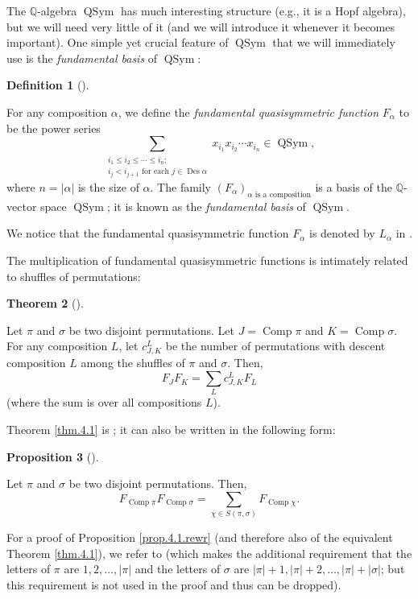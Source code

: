 \documentclass[numbers=enddot,12pt,final,onecolumn,notitlepage]{scrartcl}%
\theoremstyle{definition}
\newtheorem{theo}{Theorem}[section]
\newenvironment{theorem}[1][]
{\begin{theo}[#1]\begin{leftbar}}
{\end{leftbar}\end{theo}}
\newtheorem{prop}[theo]{Proposition}
\newenvironment{proposition}[1][]
{\begin{prop}[#1]\begin{leftbar}}
{\end{leftbar}\end{prop}}
\newtheorem{defi}[theo]{Definition}
\newenvironment{definition}[1][]
{\begin{defi}[#1]\begin{leftbar}}
{\end{leftbar}\end{defi}}
\let\sumnonlimits\sum
\renewcommand{\sum}{\sumnonlimits\limits}
\begin{document}
The $\mathbb{Q}$-algebra $\operatorname*{QSym}$ has much interesting structure
(e.g., it is a Hopf algebra), but we will need very little of it (and we will
introduce it whenever it becomes important). One simple yet crucial feature of
$\operatorname*{QSym}$ that we will immediately use is the \textit{fundamental
basis} of $\operatorname*{QSym}$:

\begin{definition}
For any composition $\alpha$, we define the \textit{fundamental quasisymmetric
function} $F_{\alpha}$ to be the power series%
\[
\sum_{\substack{i_{1}\leq i_{2}\leq\cdots\leq i_{n};\\i_{j}<i_{j+1}\text{ for
each }j\in\operatorname*{Des}\alpha}}x_{i_{1}}x_{i_{2}}\cdots x_{i_{n}}%
\in\operatorname*{QSym},
\]
where $n=\left\vert \alpha\right\vert $ is the size of $\alpha$. The family
$\left(  F_{\alpha}\right)  _{\alpha\text{ is a composition}}$ is a basis of
the $\mathbb{Q}$-vector space $\operatorname*{QSym}$; it is known as the
\textit{fundamental basis} of $\operatorname*{QSym}$.
\end{definition}

We notice that the fundamental quasisymmetric function $F_{\alpha}$ is denoted
by $L_{\alpha}$ in \cite[\S 5.2]{HopfComb}.

The multiplication of fundamental quasisymmetric functions is intimately
related to shuffles of permutations:

\begin{theorem}
\label{thm.4.1}Let $\pi$ and $\sigma$ be two disjoint permutations. Let
$J=\operatorname*{Comp}\pi$ and $K=\operatorname*{Comp}\sigma$. For any
composition $L$, let $c_{J,K}^{L}$ be the number of permutations with descent
composition $L$ among the shuffles of $\pi$ and $\sigma$. Then,%
\[
F_{J}F_{K}=\sum_{L}c_{J,K}^{L}F_{L}%
\]
(where the sum is over all compositions $L$).
\end{theorem}

Theorem \ref{thm.4.1} is \cite[Theorem 4.1]{part1}; it can also be written in
the following form:

\begin{proposition}
\label{prop.4.1.rewr}Let $\pi$ and $\sigma$ be two disjoint permutations.
Then,%
\[
F_{\operatorname*{Comp}\pi}F_{\operatorname*{Comp}\sigma}=\sum_{\chi\in
S\left(  \pi,\sigma\right)  }F_{\operatorname*{Comp}\chi}.
\]

\end{proposition}

For a proof of Proposition \ref{prop.4.1.rewr} (and therefore also of the
equivalent Theorem \ref{thm.4.1}), we refer to \cite[(5.2.6)]{HopfComb} (which
makes the additional requirement that the letters of $\pi$ are $1,2,\ldots
,\left\vert \pi\right\vert $ and the letters of $\sigma$ are $\left\vert
\pi\right\vert +1,\left\vert \pi\right\vert +2,\ldots,\left\vert
\pi\right\vert +\left\vert \sigma\right\vert $; but this requirement is not
used in the proof and thus can be dropped).
\end{document}
